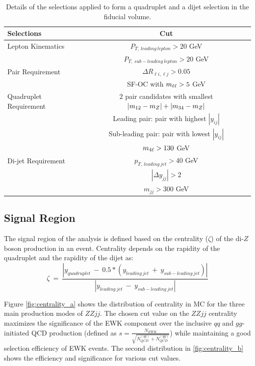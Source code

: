 \begin{table}[ht]
	\caption{Details of the selections applied to form a quadruplet and a dijet selection in the fiducial volume. 
	\label{tab:QuadDijetFidCut}}
	\begin{tabular}{|| l || c ||}
		\hline
		Selections 				&	 		Cut	\\
		\hline\hline
		Lepton Kinematics 		& $P_{T,~leading~lepton} > 20 $ GeV\\
				 				& $P_{T,~sub-leading~lepton} > 20 $ GeV\\
		\hline 
		Pair Requirement 		& $\Delta R_{\ell i,\ell	 j} > 0.05 $\\
		 						& SF-OC with $m_{\ell\ell} > 5$ GeV\\
		\hline
		Quadruplet Requirement	& $2$ pair candidates with smallest $|m_{12}	- m_{Z} | + |m_{34}	- m_{Z} |$	\\
								& Leading pair: pair with highest $|y_{ij}|$\\
								& Sub-leading pair: pair with lowest $|y_{ij}|$\\
								& $m_{4\ell} > 130 $ GeV\\
		\hline
		Di-jet Requirement		& $p_{T,~leading~jet} > 40$ GeV	\\
								& $|\Delta y_{jj}| > 2 $ \\	
								& $m_{jj} > 300$ GeV	\\
		\hline
	\end{tabular}
\end{table}

\subsection{Signal Region}
\label{subsec:SignalRegion}
The signal region of the analysis is defined based on the centrality ($\zeta$) of the di-$Z$boson production in an event. Centrality depends on the rapidity of the quadruplet and the rapidity of the dijet as:
\begin{equation}
	\zeta~=~\frac{|y_{quadruplet}~-~ 0.5*(y_{leading~jet}~+~y_{sub-leading~jet})| }{|y_{leading~jet}~-~y_{sub-leading~jet}|}
	\label{eq:centr}
\end{equation}

Figure \ref{fig:centrality_a} shows the distribution of centrality in MC for the three main production modes of $ZZjj$. The chosen cut value on the $ZZjj$ centrality maximizes the significance of the EWK component over the inclusive $qq$ and $gg$-initiated QCD production (defined as $s=\frac{N_{EWK}}{\sqrt{N_{QCD}^{(qq)}+N_{QCD}^{(gg)}}}$) while maintaining a good selection efficiency of EWK events. The second distribution in \ref{fig:centrality_b} shows the efficiency and significance for various cut values.  

